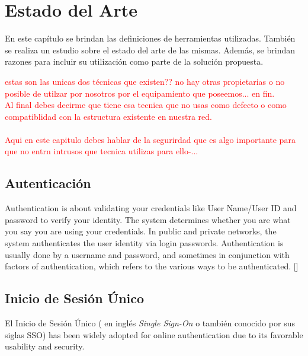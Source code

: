 \chapter{Estado del Arte}\label{chapter:state-of-the-art}
En este capítulo se brindan las definiciones de herramientas utilizadas. También se realiza un estudio sobre el estado del arte de las mismas. Además, se brindan razones para incluir su utilización como parte de la solución propuesta.

\textcolor{red}{estas son las unicas dos técnicas que existen?? no hay otras propietarias o no posible de utilzar por nosotros por el equipamiento que poseemos... en fin. \\
	Al final debes decirme que tiene esa tecnica que no usas como defecto o como compatiblidad con la estructura existente en nuestra red. \\\\
	Aqui en este capitulo debes hablar de la segurirdad que es algo importante para que no entrn intrusos que tecnica utilizas para ello-...}

\section{Autenticación}
Authentication is about validating your credentials like User Name/User ID and password to verify your identity. The system determines whether you are what you say you are using your credentials. In public and private networks, the system authenticates the user identity via login passwords. Authentication is usually done by a username and password, and sometimes in conjunction with factors of authentication, which refers to the various ways to be authenticated.
[\cite{el2019reproducible}]


\section{Inicio de Sesión Único}
El Inicio de Sesión Único ( en inglés \textit{Single Sign-On} o también conocido por sus siglas SSO) has been widely adopted for online authentication due to its favorable usability and security.

